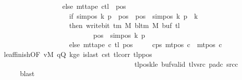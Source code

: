\begin{isabellebody}
\ \ \ \ \ \ \ \ \ \ \ \ \ \ \ \ \ \ else\ {\isacharparenleft}{\kern0pt}mt{\isacharunderscore}{\kern0pt}tape\ c{}{\isacharparenright}{\kern0pt}{\isacharparenleft}{\kern0pt}{\isacharquery}{\kern0pt}tl\ {\isacharcolon}{\kern0pt}{\isacharequal}{\kern0pt}\ {\isacharparenleft}{\kern0pt}{\isasymlambda}pos{\isachardot}{\kern0pt}\isanewline
\ \ \ \ \ \ \ \ \ \ \ \ \ \ \ \ \ \ \ \ if\ sim{\isacharunderscore}{\kern0pt}pos\ {\isacharquery}{\kern0pt}k\ {\isacharquery}{\kern0pt}p\ {\isasymle}\ pos\ {\isasymand}\ pos\ {\isacharless}{\kern0pt}\ sim{\isacharunderscore}{\kern0pt}pos\ {\isacharquery}{\kern0pt}k\ {\isacharquery}{\kern0pt}p\ {\isacharplus}{\kern0pt}\ {\isacharquery}{\kern0pt}k\isanewline
\ \ \ \ \ \ \ \ \ \ \ \ \ \ \ \ \ \ \ \ then\ write{\isacharunderscore}{\kern0pt}bit\ {\isacharparenleft}{\kern0pt}{\isasymGamma}{\isacharunderscore}{\kern0pt}tm\ M{\isacharparenright}{\kern0pt}\ {\isacharparenleft}{\kern0pt}bl{\isacharunderscore}{\kern0pt}tm\ M{\isacharparenright}{\kern0pt}\ {\isacharparenleft}{\kern0pt}buf\ {\isacharquery}{\kern0pt}tl{\isacharparenright}{\kern0pt}\isanewline
\ \ \ \ \ \ \ \ \ \ \ \ \ \ \ \ \ \ \ \ \ \ \ \ \ \ \ {\isacharparenleft}{\kern0pt}pos\ {\isacharminus}{\kern0pt}\ sim{\isacharunderscore}{\kern0pt}pos\ {\isacharquery}{\kern0pt}k\ {\isacharquery}{\kern0pt}p{\isacharparenright}{\kern0pt}\isanewline
\ \ \ \ \ \ \ \ \ \ \ \ \ \ \ \ \ \ \ \ else\ mt{\isacharunderscore}{\kern0pt}tape\ c{}\ {\isacharquery}{\kern0pt}tl\ pos{\isacharparenright}{\kern0pt}{\isacharparenright}{\kern0pt}{\isacharparenright}{\kern0pt}{\isachardoublequoteclose}\isanewline
\ \ \ \ \ c{}{\isacharunderscore}{\kern0pt}ps{\isacharcolon}{\kern0pt}\ {\isachardoublequoteopen}mt{\isacharunderscore}{\kern0pt}pos\ c{}\ {\isacharequal}{\kern0pt}\ mt{\isacharunderscore}{\kern0pt}pos\ c{}{\isachardoublequoteclose}\isanewline
\ \ \ \ \isamarkupfalse%
\ leaf{\isacharunderscore}{\kern0pt}finish{\isacharbrackleft}{\kern0pt}OF\ vM\ qQ\ kge{}\ islast\ c{}{\isacharunderscore}{\kern0pt}st\ tl{\isacharunderscore}{\kern0pt}corr\ tl{\isacharunderscore}{\kern0pt}ppos\isanewline
\ \ \ \ \ \ \ \ \ \ \ \ \ \ \ \ \ \ \ \ \ \ \ \ \ \ \ \ \ \ \ \ \ \ \ \ \ \ \ tl{\isacharunderscore}{\kern0pt}poskle\ buf{\isacharunderscore}{\kern0pt}valid\ tl{\isacharunderscore}{\kern0pt}vsrc\ pad{\isacharunderscore}{\kern0pt}c{}\ src{\isacharunderscore}{\kern0pt}c{}{\isacharbrackright}{\kern0pt}\isanewline
\ \ \ \ \isamarkupfalse%
\ blast\isanewline

\end{isabellebody}

